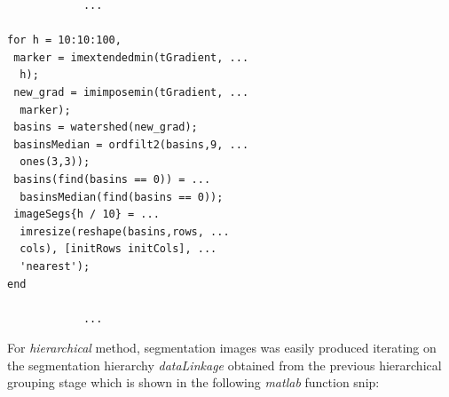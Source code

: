 \documentclass[10pt,twocolumn,letterpaper]{article}
\begin{document}
\begin{verbatim}
			...
			
for h = 10:10:100,
 marker = imextendedmin(tGradient, ...
  h);
 new_grad = imimposemin(tGradient, ...
  marker);
 basins = watershed(new_grad);
 basinsMedian = ordfilt2(basins,9, ...
  ones(3,3)); 
 basins(find(basins == 0)) = ...
  basinsMedian(find(basins == 0));
 imageSegs{h / 10} = ...
  imresize(reshape(basins,rows, ...
  cols), [initRows initCols], ...
  'nearest');
end
            
            ...
\end{verbatim}


For \textit{hierarchical} method, segmentation images was easily produced iterating on the segmentation hierarchy \textit{dataLinkage} obtained from the previous hierarchical grouping stage which is shown in the following \textit{matlab} function snip:
\end{document}
